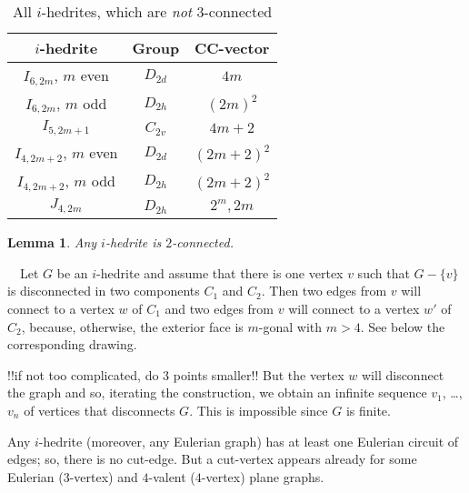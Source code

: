 \documentclass[12pt]{article}
\newtheorem{lemma}{Lemma}
\newcommand{\proof}{\noindent{\bf Proof.}\ \ }
\begin{document}
\begin{table}
\centering
\epsfxsize=100mm
\\[2mm]
\begin{tabular}{||c|c|c||}
\hline\hline
$i$-hedrite            &Group      &CC-vector\\\hline\hline
$I_{6,2m}$, $m$ even   &$D_{2d}$   &$4m$\\\hline
$I_{6,2m}$, $m$ odd    &$D_{2h}$   &$(2m)^2$\\\hline
$I_{5,2m+1}$           &$C_{2v}$   &$4m+2$\\\hline
$I_{4,2m+2}$, $m$ even &$D_{2d}$   &$(2m+2)^2$\\\hline
$I_{4,2m+2}$, $m$ odd  &$D_{2h}$   &$(2m+2)^2$\\\hline
$J_{4,2m}$             &$D_{2h}$   &$2^m, 2m$\\\hline\hline
\end{tabular}
\caption{All $i$-hedrites, which are {\em not} $3$-connected}
\label{FundamentalInfo}
\end{table}



\begin{lemma}
Any $i$-hedrite is $2$-connected.
\end{lemma}
\proof Let $G$ be an $i$-hedrite and assume that there is one vertex $v$
such that $G-\{v\}$ is disconnected in two components $C_1$ and $C_2$.
Then two edges from $v$ will connect to a vertex $w$ of $C_1$ and two
edges from $v$ will connect to a vertex $w'$ of $C_2$, because, otherwise,
the exterior face is $m$-gonal with $m>4$. See below the corresponding
drawing.

\begin{center}
\epsfxsize=60mm
\end{center}
!!if not too complicated, do 3 points smaller!!
But the vertex $w$ will disconnect the graph and so, iterating the construction, we obtain an infinite sequence $v_1$, \dots, $v_n$ of vertices that disconnects $G$. 
This is impossible since $G$ is finite.


Any $i$-hedrite (moreover, any Eulerian graph) has at least one 
Eulerian circuit of edges; so, there is no cut-edge.
But a cut-vertex appears already for some Eulerian ($3$-vertex)
and $4$-valent ($4$-vertex) plane graphs.
\end{document}

